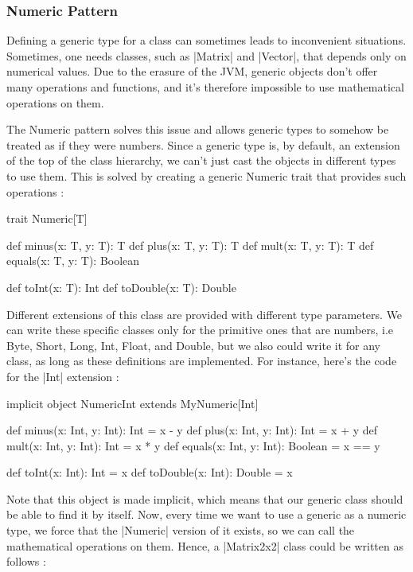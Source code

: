 \subsubsection{Numeric Pattern}

Defining a generic type for a class can sometimes leads to inconvenient situations. Sometimes, one needs classes, such as |Matrix| and |Vector|, that depends only on numerical values. Due to the erasure of the JVM, generic objects don't offer many operations and functions, and it's therefore impossible to use mathematical operations on them.

The Numeric pattern solves this issue and allows generic types to somehow be treated as if they were numbers. Since a generic type is, by default, an extension of the top of the class hierarchy, we can't just cast the objects in different types to use them. This is solved by creating a generic Numeric trait that provides such operations :

\begin{lstlisting-nobreak}
 trait Numeric[T] {
   def minus(x: T, y: T): T
   def plus(x: T, y: T): T
   def mult(x: T, y: T): T
   def equals(x: T, y: T): Boolean
   
   def toInt(x: T): Int
   def toDouble(x: T): Double
 }
\end{lstlisting-nobreak}

Different extensions of this class are provided with different type parameters. We can write these specific classes only for the primitive ones that are numbers, i.e Byte, Short, Long, Int, Float, and Double, but we also could write it for any class, as long as these definitions are implemented. For instance, here's the code for the |Int| extension :

\begin{lstlisting-nobreak}
 implicit object NumericInt extends MyNumeric[Int] {
   def minus(x: Int, y: Int): Int = x - y
   def plus(x: Int, y: Int): Int = x + y
   def mult(x: Int, y: Int): Int = x * y
   def equals(x: Int, y: Int): Boolean = x == y
   
   def toInt(x: Int): Int = x
   def toDouble(x: Int): Double = x
 }
\end{lstlisting-nobreak}

Note that this object is made implicit, which means that our generic class should be able to find it by itself. Now, every time we want to use a generic as a numeric type, we force that the |Numeric| version of it exists, so we can call the mathematical operations on them. Hence, a |Matrix2x2| class could be written as follows :

